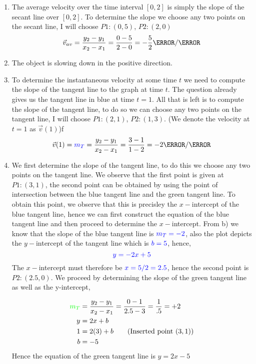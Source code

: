 \documentclass[12pt]{article} %
\begin{document}
\begin{qstn}[5]
    \begin{soln}

    \begin{enumerate}[label = (\alph*)]
        \item The average velocity over the time interval $[0,2]$ is simply the slope of the secant line over $[0,2]$. To determine the slope we choose any two points on the secant line, I will choose $P1 \colon (0,5)$, $P2 \colon (2,0)$
        $$\vec v_{av} = \frac{y_2 - y_1}{x_2 - x_1} = \frac{0 - 5}{2 - 0} = -\frac{5}{2} \m / \s$$
        

        \item The object is slowing down in the positive direction. 
        \item To determine the instantaneous velocity at some time $t$ we need to compute the slope of the tangent line to the graph at time $t$. The question already gives us the tangent line in blue at time $t = 1$. All that is left is to compute the slope of the tangent line, to do so we can choose any two points on the tangent line, I will choose $P1 \colon (2,1)$, $P2 \colon (1,3)$. (We denote the velocity at $t = 1$ as $\vec v(1)$)f
        $$\vec v(1) = \textcolor{blue}{m_T} = \frac{y_2 - y_1}{x_2 - x_1}= \frac{3 - 1}{1 - 2} = -2 \m / \s$$
        \item We first determine the slope of the tangent line, to do this we choose any two points on the tangent line. We observe that the first point is given at $P1 \colon (3,1)$, the second point can be obtained by using the point of intersection between the blue tangent line and the green tangent line. To obtain this point, we observe that this is precisley the $x-$intercept of the blue tangent line, hence we can first construct the equation of the blue tangent line and then proceed to determine the $x-$intercept. From b) we know that the slope of the blue tangent line is $\textcolor{blue}{m_T = -2}$, also the plot depicts the $y-$intercept of the tangent line which is $\textcolor{blue}{b = 5}$, hence,
        $$\textcolor{blue}{y = -2x + 5}$$
        The $x-$intercept must therefore be $\textcolor{blue}{x = 5 /2 = 2.5}$, hence the second point is $P2 \colon (2.5,0)$. We proceed by determining the slope of the green tangent line as well as the y-intercept,

        \begin{align*}
        \textcolor{green}{m_T} &= \frac{y_2 - y_1}{x_2 - x_1} = \frac{0 - 1}{2.5 - 3} = \frac{1}{.5} = +2\\
        y &= 2x + b\\
        1 &= 2(3) + b \tag{Inserted point $(3,1)$}\\
        b &= -5\\
        \end{align*}
        Hence the equation of the green tangent line is $y = 2x - 5$




     \end{enumerate}

    \end{soln}

 \end{qstn}
\end{document}

